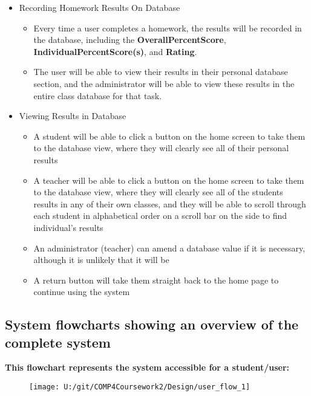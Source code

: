 \begin{itemize}
	\item Recording Homework Results On Database
	\begin{itemize}
		\item Every time a user completes a homework, the results will be recorded in the database, including the \textbf{OverallPercentScore}, \textbf{IndividualPercentScore(s)}, and \textbf{Rating}. 
		\item The user will be able to view their results in their personal database section, and the administrator will be able to view these results in the entire class database for that task.
	\end{itemize}
\end{itemize}

\begin{itemize}
	\item Viewing Results in Database
	\begin{itemize}
		\item A student will be able to click a button on the home screen to take them to the database view, where they will clearly see all of their personal results
		\item A teacher will be able to click a button on the home screen to take them to the database view, where they will clearly see all of the students results in any of their own classes, and they will be able to scroll through each student in alphabetical order on a scroll bar on the side to find individual's results
		\item An administrator (teacher) can amend a database value if it is necessary, although it is unlikely that it will be
		\item A return button will take them straight back to the home page to continue using the system
	\end{itemize}
\end{itemize}

\subsection{System flowcharts showing an overview of the complete system}

\textbf{This flowchart represents the system accessible for a student/user: }


\begin{figure}[H]
    \texttt{[image: U:/git/COMP4Coursework2/Design/user\_flow\_1]}
    \label{fig:print_function_result}\caption{}
\end{figure}

